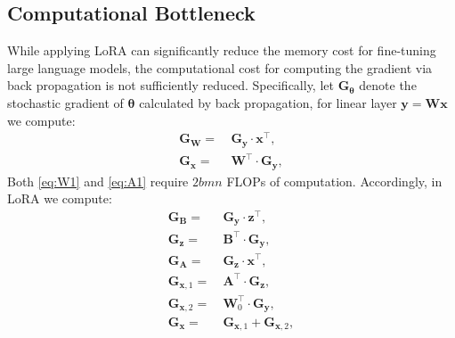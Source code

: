 \subsection{Computational Bottleneck}
While applying LoRA can significantly reduce the memory cost for fine-tuning large language models, the computational cost for computing the gradient via back propagation is not sufficiently reduced. Specifically, let $\mathbf{G}_{\mathbf{\theta}}$ denote the stochastic gradient of $\mathbf{\theta}$ calculated by back propagation, for linear layer $\mathbf{y}=\mathbf{W}\mathbf{x}$ we compute:
\begin{align}
\mathbf{G}_\mathbf{W}=&\ \mathbf{G}_\mathbf{y}\cdot\mathbf{x}^\top,\label{eq:W1}\\
\mathbf{G}_\mathbf{x}=&\ \mathbf{W}^\top\cdot \mathbf{G}_\mathbf{y},\label{eq:A1}
\end{align}
Both \eqref{eq:W1} and \eqref{eq:A1} require $2bmn$ FLOPs of computation. Accordingly, in LoRA we compute:
\begin{align}
    \mathbf{G}_\mathbf{B}=&\ \mathbf{G}_\mathbf{y}\cdot\mathbf{z}^\top,\label{eq:W'1}\\
    \mathbf{G}_\mathbf{z}=&\ \mathbf{B}^\top\cdot \mathbf{G}_\mathbf{y},\label{eq:A'1}\\
    \mathbf{G}_\mathbf{A}=&\ \mathbf{G}_\mathbf{z}\cdot\mathbf{x}^\top,\label{eq:W'2}\\
\mathbf{G}_{\mathbf{x},1}=&\ \mathbf{A}^\top\cdot \mathbf{G}_\mathbf{z},\label{eq:A'2}\\
    \mathbf{G}_{\mathbf{x},2}=&\ \mathbf{W}_0^\top\cdot \mathbf{G}_\mathbf{y},\label{eq:A'3}\\
    \mathbf{G}_\mathbf{x}=&\ \mathbf{G}_{\mathbf{x},1}+\mathbf{G}_{\mathbf{x},2},\label{eq:A'4}
\end{align}
